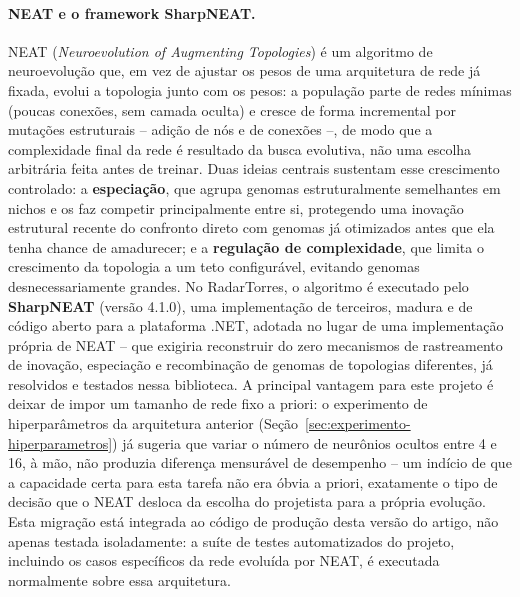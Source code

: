 \documentclass[12pt,a4paper]{article}
\begin{document}
\paragraph{NEAT e o framework SharpNEAT.}
NEAT (\textit{Neuroevolution of Augmenting Topologies}) é um algoritmo de neuroevolução que, em vez
de ajustar os pesos de uma arquitetura de rede já fixada, evolui a topologia junto com os pesos: a
população parte de redes mínimas (poucas conexões, sem camada oculta) e cresce de forma incremental
por mutações estruturais -- adição de nós e de conexões --, de modo que a complexidade final da
rede é resultado da busca evolutiva, não uma escolha arbitrária feita antes de treinar. Duas ideias
centrais sustentam esse crescimento controlado: a \textbf{especiação}, que agrupa genomas
estruturalmente semelhantes em nichos e os faz competir principalmente entre si, protegendo uma
inovação estrutural recente do confronto direto com genomas já otimizados antes que ela tenha
chance de amadurecer; e a \textbf{regulação de complexidade}, que limita o crescimento da topologia
a um teto configurável, evitando genomas desnecessariamente grandes. No RadarTorres, o algoritmo é
executado pelo \textbf{SharpNEAT} (versão 4.1.0), uma implementação de terceiros, madura e de
código aberto para a plataforma .NET, adotada no lugar de uma implementação própria de NEAT -- que
exigiria reconstruir do zero mecanismos de rastreamento de inovação, especiação e recombinação de
genomas de topologias diferentes, já resolvidos e testados nessa biblioteca. A principal vantagem
para este projeto é deixar de impor um tamanho de rede fixo a priori: o experimento de
hiperparâmetros da arquitetura anterior (Seção~\ref{sec:experimento-hiperparametros}) já sugeria que
variar o número de neurônios ocultos entre 4 e 16, à mão, não produzia diferença mensurável de
desempenho -- um indício de que a capacidade certa para esta tarefa não era óbvia a priori, exatamente
o tipo de decisão que o NEAT desloca da escolha do projetista para a própria evolução. Esta
migração está integrada ao código de produção desta versão do artigo, não apenas testada
isoladamente: a suíte de testes automatizados do projeto, incluindo os casos específicos da rede
evoluída por NEAT, é executada normalmente sobre essa arquitetura.
\end{document}
